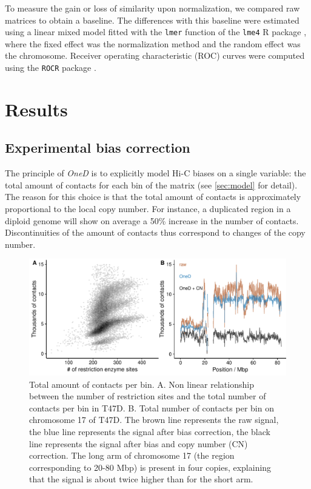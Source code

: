 \documentclass{article}
\begin{document}
To measure the gain or loss of similarity upon normalization, we compared
raw matrices to obtain a baseline. The differences with this baseline were
estimated using a linear mixed model fitted with the \texttt{lmer}
function of the \texttt{lme4} R package \citep{bates2015lme4}, where the
fixed effect was the normalization method and the random effect was the
chromosome. Receiver operating characteristic (ROC) curves were computed
using the \texttt{ROCR} package \citep{sing2005rocr}.






\section{Results}

\subsection{Experimental bias correction}

The principle of \textit{OneD} is to explicitly model Hi-C biases on a
single variable: the total amount of contacts for each bin of the matrix
(see \ref{sec:model} for detail). The reason for this choice is that the
total amount of contacts is approximately proportional to the local copy
number. For instance, a duplicated region in a diploid genome will show on
average a 50\% increase in the number of contacts. Discontinuities of the
amount of contacts thus correspond to changes of the copy number.

\begin{figure}
\centerline{\includegraphics[width=.99\textwidth]{img/figure1.pdf}}
\caption{Total amount of contacts per bin. A. Non linear relationship
between the number of restriction sites and the total number of
contacts per bin in T47D. B. Total number of contacts per bin on
chromosome 17 of T47D. The brown line represents the raw
signal, the blue line represents the signal after bias correction, the
black line represents the signal after bias and copy number (CN) correction.
The long arm of chromosome 17 (the region corresponding to 20-80 Mbp) is
present in four copies, explaining that the signal is about twice higher
than for the short arm.}
\label{fig:totals}
\end{figure}
\end{document}

